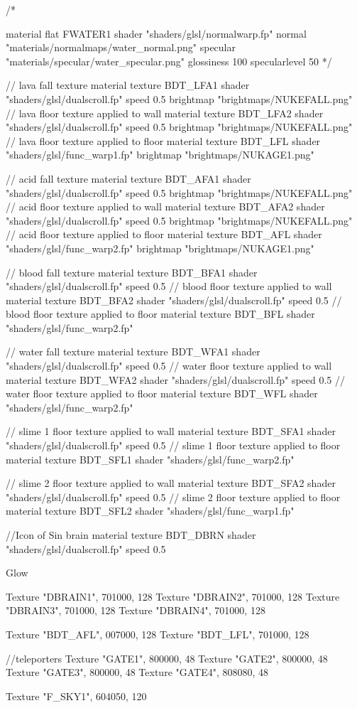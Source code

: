 /*

material flat FWATER1 {
	shader "shaders/glsl/normalwarp.fp"
	normal "materials/normalmaps/water_normal.png"
	specular "materials/specular/water_specular.png"
	glossiness 100
	specularlevel 50
}*/

// lava fall texture
material texture BDT_LFA1 {
	shader "shaders/glsl/dualscroll.fp"
	speed 0.5
	brightmap "brightmaps/NUKEFALL.png"
}
// lava floor texture applied to wall
material texture BDT_LFA2 {
	shader "shaders/glsl/dualscroll.fp"
	speed 0.5
	brightmap "brightmaps/NUKEFALL.png"
}
// lava floor texture applied to floor
material texture BDT_LFL {
	shader "shaders/glsl/func_warp1.fp"
	brightmap "brightmaps/NUKAGE1.png"
}

// acid fall texture
material texture BDT_AFA1 {
	shader "shaders/glsl/dualscroll.fp"
	speed 0.5
	brightmap "brightmaps/NUKEFALL.png"
}
// acid floor texture applied to wall
material texture BDT_AFA2 {
	shader "shaders/glsl/dualscroll.fp"
	speed 0.5
	brightmap "brightmaps/NUKEFALL.png"
}
// acid floor texture applied to floor
material texture BDT_AFL {
	shader "shaders/glsl/func_warp2.fp"
	brightmap "brightmaps/NUKAGE1.png"
}

// blood fall texture
material texture BDT_BFA1 {
	shader "shaders/glsl/dualscroll.fp"
	speed 0.5
}
// blood floor texture applied to wall
material texture BDT_BFA2 {
	shader "shaders/glsl/dualscroll.fp"
	speed 0.5
}
// blood floor texture applied to floor
material texture BDT_BFL {
	shader "shaders/glsl/func_warp2.fp"
}

// water fall texture
material texture BDT_WFA1 {
	shader "shaders/glsl/dualscroll.fp"
	speed 0.5
}
// water floor texture applied to wall
material texture BDT_WFA2 {
	shader "shaders/glsl/dualscroll.fp"
	speed 0.5
}
// water floor texture applied to floor
material texture BDT_WFL {
	shader "shaders/glsl/func_warp2.fp"
}

// slime 1 floor texture applied to wall
material texture BDT_SFA1 {
	shader "shaders/glsl/dualscroll.fp"
	speed 0.5
}
// slime 1 floor texture applied to floor
material texture BDT_SFL1 {
	shader "shaders/glsl/func_warp2.fp"
}

// slime 2 floor texture applied to wall
material texture BDT_SFA2 {
	shader "shaders/glsl/dualscroll.fp"
	speed 0.5
}
// slime 2 floor texture applied to floor
material texture BDT_SFL2 {
	shader "shaders/glsl/func_warp1.fp"
}

//Icon of Sin brain
material texture BDT_DBRN {
	shader "shaders/glsl/dualscroll.fp"
	speed 0.5
}

Glow {
	Texture "DBRAIN1", 701000, 128
	Texture "DBRAIN2", 701000, 128
	Texture "DBRAIN3", 701000, 128
	Texture "DBRAIN4", 701000, 128
	
	Texture "BDT_AFL", 007000, 128
	Texture "BDT_LFL", 701000, 128
	
	//teleporters
	Texture "GATE1", 800000, 48
	Texture "GATE2", 800000, 48
	Texture "GATE3", 800000, 48
	Texture "GATE4", 808080, 48
	
	Texture "F_SKY1", 604050, 120
}
